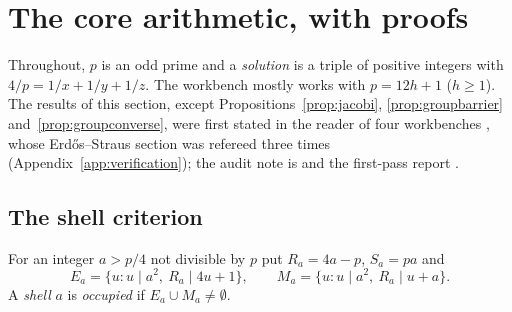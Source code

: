 \section{The core arithmetic, with proofs}\label{sec:core}

Throughout, $p$ is an odd prime and a \emph{solution} is a triple of positive integers with $4/p=1/x+1/y+1/z$. The workbench mostly works with $p=12h+1$ ($h\ge1$). The results of this section, except Propositions~\ref{prop:jacobi}, \ref{prop:groupbarrier} and~\ref{prop:groupconverse}, were first stated in the reader of four workbenches \cite{WorkbenchReader}, whose Erdős--Straus section was refereed three times (Appendix~\ref{app:verification}); the audit note is  and the first-pass report .

\subsection{The shell criterion}

For an integer $a>p/4$ not divisible by $p$ put $R_a=4a-p$, $S_a=pa$ and
\[
E_a=\{u: u\mid a^2,\ R_a\mid 4u+1\},\qquad M_a=\{u: u\mid a^2,\ R_a\mid u+a\}.
\]
A \emph{shell} $a$ is \emph{occupied} if $E_a\cup M_a\neq\emptyset$.

